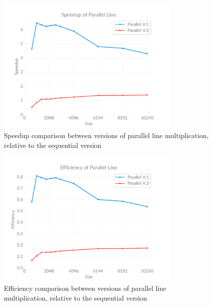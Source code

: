     \begin{figure}[h]
        \centering
        \captionsetup{justification=centering, margin=1.2cm}
        \includegraphics[width=0.8\textwidth]{pdf/parallel-speedup}
        \caption{Speedup comparison between versions of parallel line multiplication, relative to the sequential version}
        \label{fig:chart:parallel-speedup}
    \end{figure}

    \begin{figure}[h]
        \centering
        \captionsetup{justification=centering, margin=1.2cm}
        \includegraphics[width=0.8\textwidth]{pdf/parallel-efficiency}
        \caption{Efficiency comparison between versions of parallel line multiplication, relative to the sequential version}
        \label{fig:chart:parallel-efficiency}
    \end{figure}

\clearpage